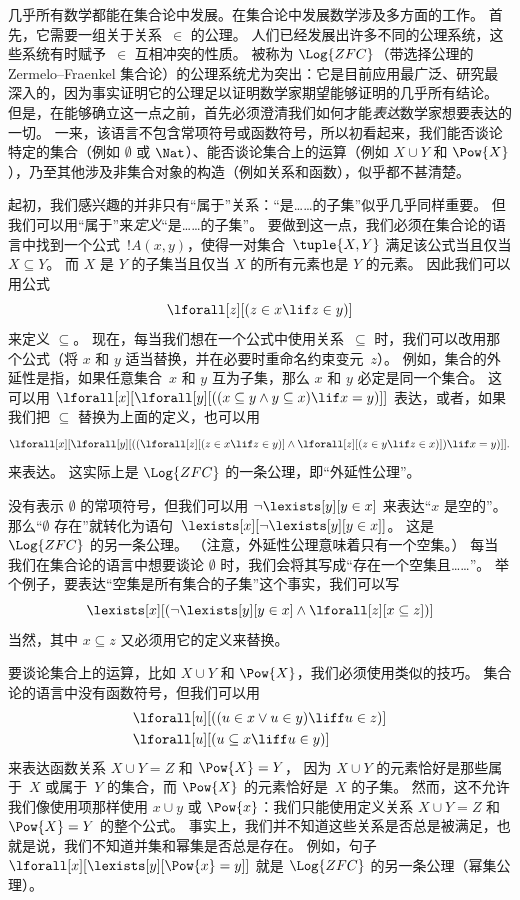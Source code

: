 \documentclass[../../../include/open-logic-section]{subfiles}
\begin{document}


几乎所有数学都能在集合论中发展。在集合论中发展数学涉及多方面的工作。
首先，它需要一组关于关系~$\in$ 的公理。
人们已经发展出许多不同的公理系统，这些系统有时赋予~$\in$ 互相冲突的性质。
被称为 $\Log{ZFC}$（带选择公理的 Zermelo--Fraenkel 集合论）的公理系统尤为突出：它是目前应用最广泛、研究最深入的，因为事实证明它的公理足以证明数学家期望能够证明的几乎所有结论。
但是，在能够确立这一点之前，首先必须澄清我们如何才能\emph{表达}数学家想要表达的一切。
一来，该语言不包含常项符号或函数符号，所以初看起来，我们能否谈论特定的集合（例如 $\emptyset$ 或 $\Nat$）、能否谈论集合上的运算（例如 $X \cup Y$ 和 $\Pow{X}$），乃至其他涉及非集合对象的构造（例如关系和函数），似乎都不甚清楚。

起初，我们感兴趣的并非只有“属于”关系：“是……的子集”似乎几乎同样重要。
但我们可以用“属于”来\emph{定义}“是……的子集”。
要做到这一点，我们必须在集合论的语言中找到一个公式~$!A(x, y)$，使得一对集合~$\tuple{X, Y}$ 满足该公式当且仅当 $X \subseteq Y$。
而 $X$ 是 $Y$ 的子集当且仅当 $X$ 的所有元素也是 $Y$ 的元素。
因此我们可以用公式
\[
\lforall[z][(z \in x \lif z \in y)]
\]
来定义 $\subseteq$。
现在，每当我们想在一个公式中使用关系~$\subseteq$ 时，我们可以改用那个公式（将 $x$ 和 $y$ 适当替换，并在必要时重命名约束变元~$z$）。
例如，集合的外延性是指，如果任意集合~$x$ 和 $y$ 互为子集，那么 $x$ 和 $y$ 必定是同一个集合。
这可以用 $\lforall[x][\lforall[y][((x \subseteq y \land y
    \subseteq x) \lif x = y)]]$ 表达，或者，如果我们把 $\subseteq$ 替换为上面的定义，也可以用
\[
\lforall[x][\lforall[y][((\lforall[z][(z \in x \lif z \in y)] \land
    \lforall[z][(z \in y \lif z \in x)]) \lif x = y)]].
\]
来表达。
这实际上是 $\Log{ZFC}$ 的一条公理，即“外延性公理”。

没有表示 $\emptyset$ 的常项符号，但我们可以用 $\lnot \lexists[y][y \in x]$ 来表达“$x$ 是空的”。
那么“$\emptyset$ 存在”就转化为语句~$\lexists[x][\lnot \lexists[y][y \in
    x]]$。
这是 $\Log{ZFC}$ 的另一条公理。
（注意，外延性公理意味着只有一个空集。）
每当我们在集合论的语言中想要谈论 $\emptyset$ 时，我们会将其写成“存在一个空集且……”。
举个例子，要表达“空集是所有集合的子集”这个事实，我们可以写
\[
\lexists[x][(\lnot\lexists[y][y \in x] \land \lforall[z][x \subseteq
    z])]
\]
当然，其中 $x \subseteq z$ 又必须用它的定义来替换。

要谈论集合上的运算，比如 $X \cup Y$ 和 $\Pow{X}$，我们必须使用类似的技巧。
集合论的语言中没有函数符号，但我们可以用
\begin{align*}
& \lforall[u][((u \in x \lor u \in y) \liff u \in z)]\\
& \lforall[u][(u \subseteq x \liff u \in y )]
\end{align*}
来表达函数关系 $X \cup Y = Z$ 和 $\Pow{X} = Y$，
因为 $X \cup Y$ 的元素恰好是那些属于~$X$ 或属于~$Y$ 的集合，而 $\Pow{X}$ 的元素恰好是~$X$ 的子集。
然而，这不允许我们像使用项那样使用 $x \cup y$ 或 $\Pow{x}$：我们只能使用定义关系 $X \cup Y = Z$ 和 $\Pow{X} = Y$ 的整个公式。
事实上，我们并不知道这些关系是否总是被满足，也就是说，我们不知道并集和幂集是否总是存在。
例如，句子 $\lforall[x][\lexists[y][\Pow{x} = y]]$ 就是 $\Log{ZFC}$ 的另一条公理（幂集公理）。
\end{document}
